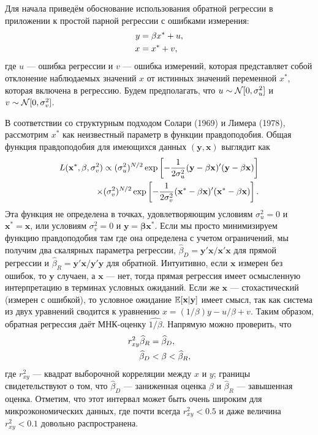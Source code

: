 Для начала приведём обоснование использования обратной регрессии в приложении к простой парной регрессии с ошибками измерения:
\begin{align}
y&=\beta x^*+u, \\
x&=x^*+v, \notag
\end{align}
где $u$ --– ошибка регрессии  и $v$ --– ошибка измерений, которая представляет собой отклонение наблюдаемых значений $x$ от истинных значений переменной $x^*$, которая включена в регрессию. Будем предполагать, что $u \sim \mathcal{N} [0,\sigma^2_u]$ и $v \sim \mathcal{N} [0,\sigma^2_v]$.

В соответствии со структурным подходом Солари (1969) и Лимера (1978), рассмотрим $x^*$ как  неизвестный параметр в функции правдоподобия. Общая функция правдоподобия для имеющихся данных $(\mathbf{y}, \mathbf{x})$ выглядит как
\begin{align}
L(\mathbf{x^*}, \beta, \sigma^2_v)\propto ( \sigma^2_u)^{N/2} \exp \left[ -\frac{1}{2\sigma^2_u}(\mathbf{y-\beta x})'(\mathbf{y-\beta x}) \right] \notag \\
\times ( \sigma^2_v)^{N/2} \exp \left[ -\frac{1}{2\sigma^2_v}(\mathbf{x^*-\beta x})'(\mathbf{x^*-\beta x}) \right].
\end{align}
Эта функция не определена в точках, удовлетворяющим условиям $\sigma^2_u=0$ и $\mathbf{x^*}=\mathbf{x}$, или условиям $\sigma^2_v=0$ и $\mathbf{y}=\mathbf{\beta x^*}$. Если мы просто минимизируем  функцию правдоподобия там где она определена с учетом ограничений, мы получим два скалярных параметра регрессии, $\widehat{\beta}_D=\mathbf{y'x/x'x}$ для прямой регрессии и $\widehat{\beta}_R=\mathbf{y'x/y'y}$ для обратной. Интуитивно, если $\mathbf{x}$ измерен без ошибок, то $\mathbf{y}$ случаен, а $\mathbf{x}$ --- нет, тогда прямая регрессия имеет осмысленную интерпретацию в терминах условных ожиданий. Если же  $\mathbf{x}$ --- стохастический (измерен с ошибкой), то условное ожидание $\mathbb{E}[\mathbf{x|y}]$ имеет смысл, так как система из двух уравнений сводится к уравнению $x=(1/\beta)y-u/\beta+v$. Таким образом, обратная регрессия даёт МНК-оценку $\widehat{1/\beta}$. Напрямую можно проверить, что
\begin{align}
r^2_{xy} \widehat{\beta}_R&=\widehat{\beta}_D, \\
\widehat{\beta}_D &< \beta < \widehat{\beta}_R, \notag
\end{align}
где $r^2_{xy}$ --- квадрат выборочной корреляции между $x$ и $y$; границы свидетельствуют о том, что $\widehat{\beta}_D$ --- заниженная оценка $\beta$ и $\widehat{\beta}_R$ --- завышенная оценка. Отметим, что этот интервал может быть очень широким для микроэкономических данных, где почти всегда $r^2_{xy}<0.5$ и даже величина $r^2_{xy}<0.1$ довольно распространена.

